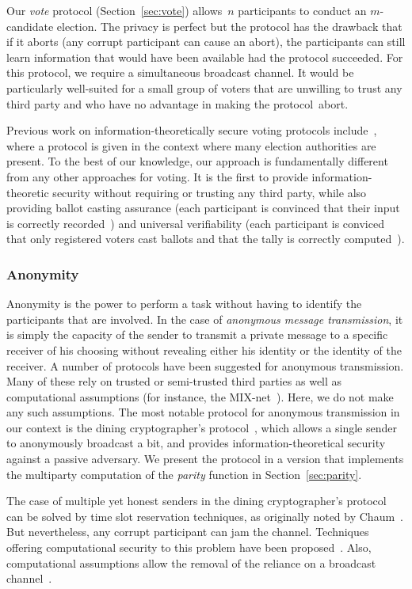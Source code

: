 \documentclass[11pt]{article}
\begin{document}
Our \emph{vote} protocol (Section~\ref{sec:vote}) allows~$n$
participants to conduct an $m$-candidate election. The privacy is
perfect but the protocol has the drawback that if it aborts (any
corrupt participant can cause an abort), the participants can still
learn information that would have been available had the protocol
succeeded.  For this protocol, we require a simultaneous broadcast
channel. It would be particularly well-suited for a small group of
voters that are unwilling to trust any third party and who have no
advantage in making the protocol~abort.

Previous work on information-theoretically secure voting protocols
include~\cite{CFSY96}, where a protocol is given in the context
where many election authorities are present. To the best of our
knowledge, our approach is fundamentally different from any other
approaches for  voting. It is the first to provide
information-theoretic security without requiring or trusting any
third party, while also providing ballot casting assurance (each
participant is convinced that their input is correctly
recorded~\cite{AN06}) and universal verifiability (each participant
is conviced that only registered voters cast ballots and that the
tally is correctly computed~\cite{SK95}).

\subsubsection{Anonymity}

Anonymity is the power to perform a task without having to identify
the participants that are involved.  In the case of \emph{anonymous
message transmission}, it is simply the capacity of the sender to
transmit a private message to a specific receiver of his choosing
without revealing either his identity or the identity of the
receiver. A number of protocols have been suggested for anonymous
transmission. Many of these rely on trusted or semi-trusted third
parties as well as computational assumptions (for instance, the
MIX-net~\cite{Chaum81}). Here, we do not make any such assumptions.
The most notable protocol for anonymous transmission in our context
is the dining cryptographer's protocol~\cite{Chaum88}, which allows
a single sender to anonymously broadcast a bit, and provides
information-theoretical security against a passive adversary. We
present the protocol in a version that implements the multiparty
computation of the \emph{parity} function in
Section~\ref{sec:parity}.


The case of multiple yet honest senders in the dining
cryptographer's protocol can be solved by time slot reservation
techniques, as originally noted by Chaum~\cite{Chaum88}. But
nevertheless, any corrupt participant can jam the channel.
Techniques offering computational security to this problem have been
proposed~\cite{Chaum88,WP89}. Also,  computational assumptions allow
the removal of the reliance on a broadcast channel~\cite{WP89Disco}.
\end{document}
